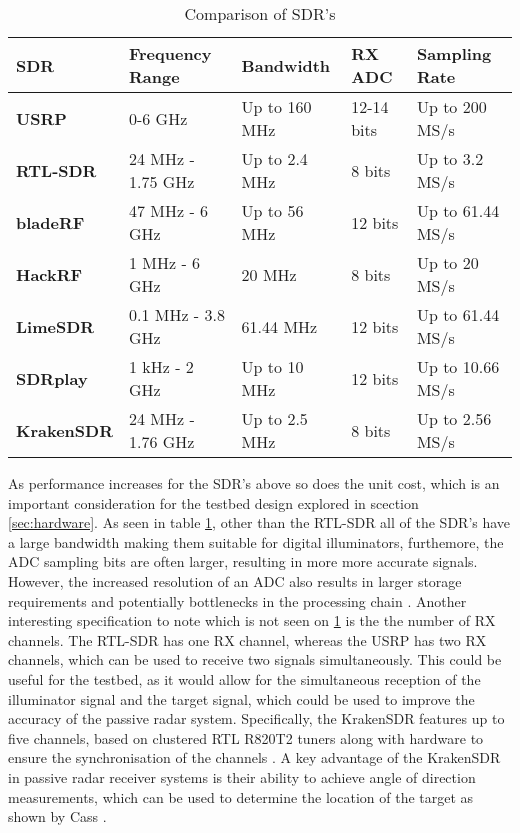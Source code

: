 \begin{table}[h!]
    \centering
    \caption{Comparison of SDR's \cite{SDRmoduleComparison} \label{tab:SDRcomparison}}
    \begin{tabular}{|l|l|l|l|l|}
    \hline
    \textbf{SDR} & \textbf{Frequency Range} & \textbf{Bandwidth} & \textbf{RX ADC} & \textbf{Sampling Rate} \\ \hline
    \textbf{USRP} & 0-6 GHz & Up to 160 MHz & 12-14 bits & Up to 200 MS/s \\ \hline
    \textbf{RTL-SDR} & 24 MHz - 1.75 GHz & Up to 2.4 MHz & 8 bits & Up to 3.2 MS/s \\ \hline
    \textbf{bladeRF} & 47 MHz - 6 GHz & Up to 56 MHz & 12 bits & Up to 61.44 MS/s \\ \hline
    \textbf{HackRF} & 1 MHz - 6 GHz & 20 MHz & 8 bits & Up to 20 MS/s \\ \hline
    \textbf{LimeSDR} & 0.1 MHz - 3.8 GHz & 61.44 MHz & 12 bits & Up to 61.44 MS/s \\ \hline
    \textbf{SDRplay} & 1 kHz - 2 GHz & Up to 10 MHz & 12 bits & Up to 10.66 MS/s \\ \hline
    \textbf{KrakenSDR} & 24 MHz - 1.76 GHz & Up to 2.5 MHz & 8 bits & Up to 2.56 MS/s \\ \hline
    \end{tabular}
\end{table}

As performance increases for the SDR's above so does the unit cost, which is an important consideration for the testbed design explored in scection \ref*{sec:hardware}. As seen in table \ref{tab:SDRcomparison}, other than the RTL-SDR all of the SDR's have a large bandwidth making them suitable for digital illuminators, furthemore, the ADC sampling bits are often larger, resulting in more more accurate signals. However, the increased resolution of an ADC also results in larger storage requirements and potentially bottlenecks in the processing chain \cite{SDRmoduleComparison}. Another interesting specification to note which is not seen on \ref*{tab:SDRcomparison} is the the number of RX channels. The RTL-SDR has one RX channel, whereas the USRP has two RX channels, which can be used to receive two signals simultaneously. This could be useful for the testbed, as it would allow for the simultaneous reception of the illuminator signal and the target signal, which could be used to improve the accuracy of the passive radar system. Specifically, the KrakenSDR features up to five channels, based on clustered RTL R820T2 tuners along with hardware to ensure the synchronisation of the channels \cite{KrakenSDR}. A key advantage of the KrakenSDR in passive radar receiver systems is their ability to achieve angle of direction measurements, which can be used to determine the location of the target as shown by Cass \cite{KrakenSDR}.


